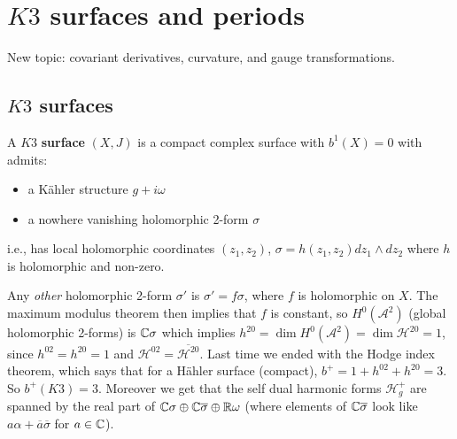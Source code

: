 \section{$K 3$ surfaces and periods} 
New topic: covariant derivatives, curvature, and gauge transformations.
\subsection{$K 3$ surfaces}
\begin{definition}[]
    A $K3$ \textbf{surface}  $(X,J)$ is a compact complex surface with $b^1(X) = 0$ with admits:
    \begin{itemize}
    \setlength\itemsep{-.2em}
        \item a K\"ahler structure $g+i\omega$
        \item a nowhere vanishing holomorphic 2-form $\sigma$
    \end{itemize} i.e., has local holomorphic coordinates $(z_1,z_2)$, $\sigma = h(z_1,z_2)dz_1 \wedge dz_2$ where $h$ is holomorphic and non-zero.
\end{definition}
Any \emph{other} holomorphic 2-form $\sigma'$ is $\sigma' =f \sigma$, where $f$ is holomorphic on $X$. The maximum modulus theorem then implies that $f$ is constant, so $H^0(\mathcal A^2)$ (global holomorphic 2-forms) is $\mathbb{C} \sigma$ which implies $h ^{20}=\dim H^0(\mathcal A^2) = \dim \mathcal H ^{20}=1$, since $h ^{02}= h ^{20}=1$ and $\mathcal H ^{02}= \overline{\mathcal H ^{20}}$.
Last time we ended with the Hodge index theorem, which says that for a H\"ahler surface (compact), $b^+ = 1 + h ^{02} + h ^{20}=3$. So $b^+(K 3) = 3$. Moreover we get that the self dual harmonic forms $\mathcal H ^+ _g$ are spanned by the real part of  $\mathbb{C}\sigma\oplus\mathbb{C} \overline{\sigma}\oplus \mathbb{R} \omega$ (where elements of $\mathbb{C} \overline{\sigma}$ look like $a\alpha +\overline{a}\overline{\sigma}$ for $a \in \mathbb{C}$).

